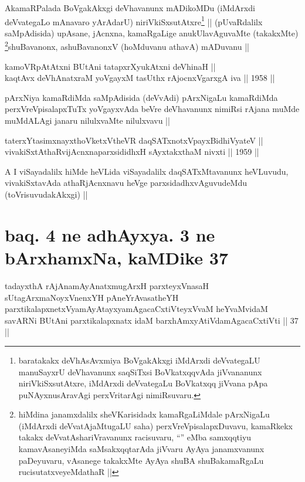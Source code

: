 \begin{artha}
AkamaRPalada BoVgakAkxgi deVhavanunx mADikoMDu (iMdArxdi deVvategaLo
mAnavaro yArAdarU) niriVkiSxsutAtxre\footnote[1]{baratakakx
  deVhAsAvxmiya BoVgakAkxgi iMdArxdi deVvategaLU manuSayxrU
  deVhavanunx saqSiTxsi BoVkatxqqvAda jiVvananunx niriVkiSxsutAtxre,
  iMdArxdi deVvategaLu BoVkatxqq jiVvana pApa puNAyxnusAravAgi
  perxVritarAgi nimiRsuvaru.} || (pUvaRdalilx
saMpAdisida) upAsane, jAcnxna, kamaRgaLige anukUlavAguvaMte
(takakxMte) \footnote[2]{hiMdina janamxdalilx sheVKarisidadx
  kamaRgaLiMdale pArxNigaLu (iMdArxdi deVvatAjaMtugaLU saha)
  perxVreVpisalapxDuvavu, kamaRkekx takakx deVvatAshariVravanunx
  racisuvaru, ``\stext'' eMba samxqqtiyu kamavAsaneyiMda
  saMsakxqqtarAda jiVvaru AyAya janamxvanunx paDeyuvaru, vAsanege
  takakxMte AyAya shuBA shuBakamaRgaLu rucisutatxveyeMdathaR ||}shuBavanonx, ashuBavanonxV (hoMduvanu
athavA) mADuvanu ||
\end{artha}

\begin{shl}
kamoVRpAtAtxni BUtAni tatapxrXyukAtxni deVhinaH || \\
kaqtAvx deVhAnatxraM yoVgayxM tasUthx rAjocnxV\s garxgA iva ||  1958 ||  
\end{shl}

\begin{artha}
pArxNiya kamaRdiMda saMpAdisida (deVvAdi) pArxNigaLu kamaRdiMda
perxVreVpisalapxTuTx yoVgayxvAda beVre deVhavanunx nimiRsi rAjana
muMde muMdALAgi janaru nilulxvaMte nilulxvavu ||
\end{artha}

\begin{shl}
taterxYtasimxnayxthoVketxV\s theVR daqSATxnotxV\s payxBidhiVyateV ||  \\
vivakiSxtAthaRvijAcnxnaparxsididhxH sAyxtakxthaM nivxti ||  1959 ||  
\end{shl}

\begin{artha}
A I viSayadalilx hiMde heVLida viSayadalilx daqSATxMtavanunx
heVLuvudu, vivakiSxtavAda athaRjAcnxnavu heVge parxsidadhxvAguvudeMdu
(toVrisuvudakAkxgi) ||
\end{artha}

\section*{baq. 4 ne adhAyxya. 3 ne bArxhamxNa, kaMDike 37}

\begin{shl}
tadayxthA rAjAnamAyAnatxmugArxH parxteyxVnasaH sUtagArxmaNoyxV\s nenxYH pAneYrAvasatheYH parxtikalapxnetxV\s yamAyAtayxyamAgacaCxtiVteyxVvaM heYvaMvidaM savARNi BUtAni parxtikalapxnatx idaM barxhAmxyAtiVdamAgacaCxtiVti || 37 ||
\end{shl}

